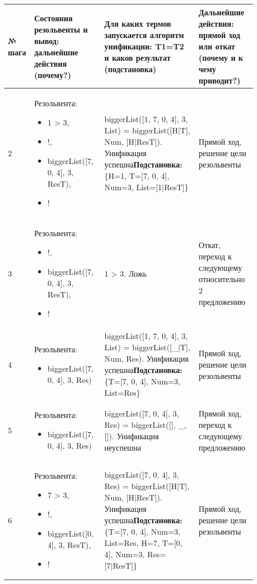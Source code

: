\documentclass[14pt,a4paper]{scrreprt}
\begin{document}
\begin{table}[H]
	\begin{tabular}{|p{0.8cm\small}|p{4.7cm\small}|p{5.7cm\small}|p{4cm\small}|}	
		\hline
		№ шага & Состояния резольвенты и вывод: дальнейшие действия (почему?) & Для каких термов запускается алгоритм унификации: T1=T2 и каков результат (подстановка) & Дальнейшие действия: прямой ход или откат (почему и к чему приводит?)\\
		\hline
		2 & Резольвента: \begin{itemize} \item 1 > 3, \item !, \item biggerList([7, 0, 4], 3, ResT), \item ! \end{itemize} & biggerList([1, 7, 0, 4], 3, List) = biggerList([H|T], Num, [H|ResT]). Унификация успешна\linebreak \textbf{Подстановка:} \{H=1, T=[7, 0, 4], Num=3, List=[1|ResT]\} & Прямой ход, решение цели резольвенты\\
		\hline
		3 & Резольвента: \begin{itemize} \item !, \item biggerList([7, 0, 4], 3, ResT), \item ! \end{itemize} & 1 > 3. Ложь & Откат, переход к следующему относительно 2 предложению\\
		\hline
		4 & Резольвента: \begin{itemize} \item biggerList([7, 0, 4], 3, Res) \end{itemize} & biggerList([1, 7, 0, 4], 3, List) = biggerList([\_|T], Num, Res). Унификация успешна\linebreak \textbf{Подстановка:} \{T=[7, 0, 4], Num=3, List=Res\} & Прямой ход, решение цели резольвенты\\
		\hline
		5 & Резольвента: \begin{itemize} \item biggerList([7, 0, 4], 3, Res) \end{itemize} & biggerList([7, 0, 4], 3, Res) = biggerList([], \_, []). Унификация неуспешна & Прямой ход, переход к следующему предложению\\
		\hline
		6 & Резольвента: \begin{itemize} \item 7 > 3, \item !, \item biggerList([0, 4], 3, ResT), \item ! \end{itemize} & biggerList([7, 0, 4], 3, Res) = biggerList([H|T], Num, [H|ResT]). Унификация успешна\linebreak \textbf{Подстановка:} \{T=[7, 0, 4], Num=3, List=Res, H=7, T=[0, 4], Num=3, Res=[7|ResT]\} & Прямой ход, решение цели резольвенты\\

\end{tabular}
\end{table}
\end{document}
